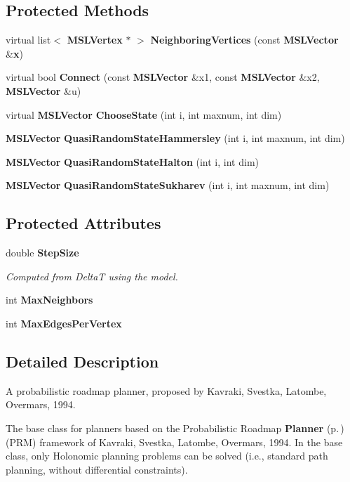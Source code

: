 \subsection*{Protected Methods}
\begin{CompactItemize}
\item 
virtual list$<$ {\bf MSLVertex} $\ast$ $>$ {\bf Neighboring\-Vertices} (const {\bf MSLVector} \&{\bf x})
\item 
virtual bool {\bf Connect} (const {\bf MSLVector} \&x1, const {\bf MSLVector} \&x2, {\bf MSLVector} \&u)
\item 
virtual {\bf MSLVector} {\bf Choose\-State} (int i, int maxnum, int dim)
\item 
{\bf MSLVector} {\bf Quasi\-Random\-State\-Hammersley} (int i, int maxnum, int dim)
\item 
{\bf MSLVector} {\bf Quasi\-Random\-State\-Halton} (int i, int dim)
\item 
{\bf MSLVector} {\bf Quasi\-Random\-State\-Sukharev} (int i, int maxnum, int dim)
\end{CompactItemize}
\subsection*{Protected Attributes}
\begin{CompactItemize}
\item 
double {\bf Step\-Size}
\begin{CompactList}\small\item\em Computed from Delta\-T using the model.\item\end{CompactList}\item 
int {\bf Max\-Neighbors}
\item 
int {\bf Max\-Edges\-Per\-Vertex}
\end{CompactItemize}


\subsection{Detailed Description}
A probabilistic roadmap planner, proposed by Kavraki, Svestka, Latombe, Overmars, 1994.

The base class for planners based on the Probabilistic Roadmap {\bf Planner} {\rm (p.\,\pageref{classPlanner})} (PRM) framework of Kavraki, Svestka, Latombe, Overmars, 1994. In the base class, only Holonomic planning problems can be solved (i.e., standard path planning, without differential constraints). 



